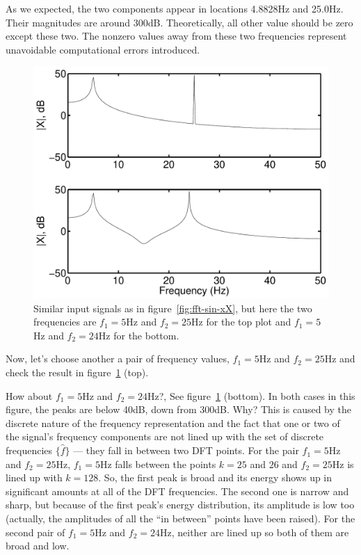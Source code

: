As we expected, the two components appear in locations 4.8828Hz and
25.0Hz. Their magnitudes are around 300dB. Theoretically, all other
value should be zero except these two. The nonzero values away from
these two frequencies represent unavoidable computational errors
introduced.

\begin{figure}
\centerline{\includegraphics[width=5in]{ch-fft/fft-leakage}}
\caption[Sum of two sinusoids with 512 samples and its  
FFT; different frequencies]{Similar input signals as in
figure~\protect\ref{fig:fft-sin-xX}, but here the two frequencies are
$f_1=5$Hz and $f_2=25$Hz for the top plot and $f_1=5$Hz and $f_2=24$Hz
for the bottom.
\label{fig:fft-leakage}}
\end{figure}

Now, let's choose another a pair of frequency values, $f_1=5$Hz and
$f_2=25$Hz and check the result in figure~\ref{fig:fft-leakage} (top).

How about $f_1=5$Hz and $f_2=24$Hz?, See figure~\ref{fig:fft-leakage}
(bottom). In both cases in this figure, the peaks are below 40dB, down
from 300dB. Why? This is caused by the discrete nature of the
frequency representation and the fact that one or two of the signal's
frequency components are not lined up with the set of discrete
frequencies $\{\hat{f}\}$ --- they fall in between two DFT points. For
the pair $f_1=5$Hz and $f_2=25$Hz, $f_1=5$Hz falls between the points
$k=25$ and $26$ and $f_2=25$Hz is lined up with $k=128$. So, the first
peak is broad and its energy shows up in significant amounts at all of
the DFT frequencies.  The second one is narrow and sharp, but because
of the first peak's energy distribution, its amplitude is low too
(actually, the amplitudes of all the ``in between'' points have been
raised). For the second pair of $f_1=5$Hz and $f_2=24$Hz, neither are
lined up so both of them are broad and low.

